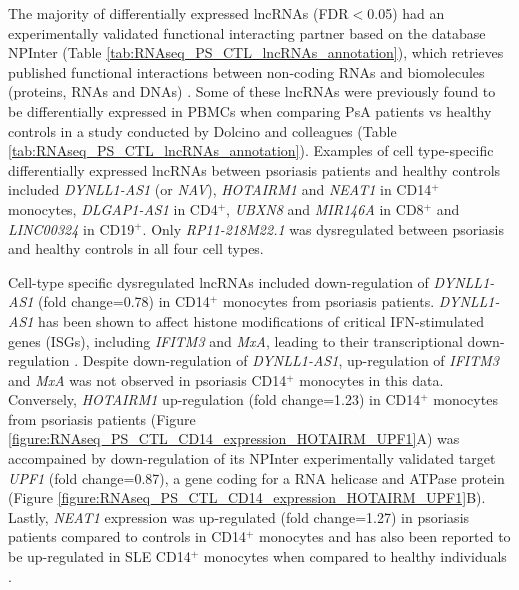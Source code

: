 The majority of differentially expressed lncRNAs (FDR$<$0.05) had an experimentally validated functional interacting partner based on the database NPInter (Table \ref{tab:RNAseq_PS_CTL_lncRNAs_annotation}), which retrieves published functional interactions between non-coding RNAs and biomolecules (proteins, RNAs and DNAs) \parencite{Hao2016}. Some of these lncRNAs were previously found to be differentially expressed in PBMCs when comparing PsA patients vs healthy controls in a study conducted by Dolcino and colleagues \parencite{Dolcino2018} (Table \ref{tab:RNAseq_PS_CTL_lncRNAs_annotation}). Examples of cell type-specific differentially expressed lncRNAs between psoriasis patients and healthy controls included \textit{DYNLL1-AS1} (or \textit{NAV}), \textit{HOTAIRM1} and \textit{NEAT1} in CD14$^+$ monocytes, \textit{DLGAP1-AS1} in CD4$^+$, \textit{UBXN8} and \textit{MIR146A} in CD8$^+$ and \textit{LINC00324} in CD19$^+$. Only \textit{RP11-218M22.1} was dysregulated between psoriasis and healthy controls in all four cell types. 

Cell-type specific dysregulated lncRNAs included down-regulation of \textit{DYNLL1-AS1} (fold change=0.78) in CD14$^+$ monocytes from psoriasis patients. \textit{DYNLL1-AS1} has been shown to affect histone modifications of critical IFN-stimulated genes (ISGs), including \textit{IFITM3} and \textit{MxA}, leading to their transcriptional down-regulation \parencite{Ouyang2014}. Despite down-regulation of \textit{DYNLL1-AS1}, up-regulation of \textit{IFITM3} and \textit{MxA} was not observed in psoriasis CD14$^+$ monocytes in this data. Conversely, \textit{HOTAIRM1} up-regulation (fold change=1.23) in CD14$^+$ monocytes from psoriasis patients (Figure \ref{figure:RNAseq_PS_CTL_CD14_expression_HOTAIRM_UPF1}A) was accompained by down-regulation of its NPInter experimentally validated target \textit{UPF1} (fold change=0.87), a gene coding for a RNA helicase and ATPase protein \parencite{Hao2016} (Figure \ref{figure:RNAseq_PS_CTL_CD14_expression_HOTAIRM_UPF1}B). Lastly, \textit{NEAT1} expression was up-regulated (fold change=1.27) in psoriasis patients compared to controls in CD14$^+$ monocytes and has also been reported to be up-regulated in SLE CD14$^+$ monocytes when compared to healthy individuals \parencite{Zhang2016}.


